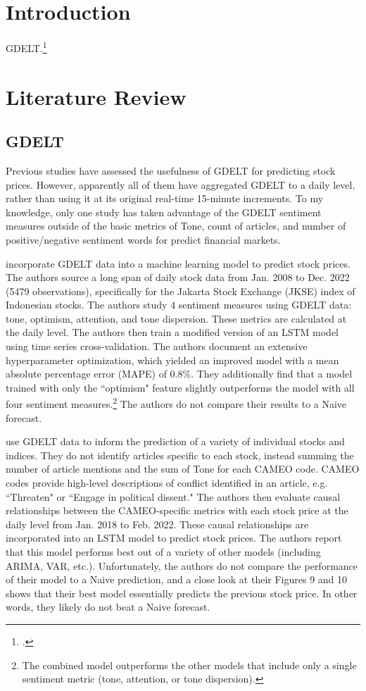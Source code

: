 \documentclass[12pt]{article}
\begin{document}
\section{Introduction}

GDELT.\footnote{\cite{leetaru2013gdelt}.}
\section{Literature Review}
\subsection{GDELT}
Previous studies have assessed the usefulness of GDELT for predicting stock prices. However, apparently all of them have aggregated GDELT to a daily level, rather than using it at its original real-time 15-minute increments. To my knowledge, only one study has taken advantage of the GDELT sentiment measures outside of the basic metrics of Tone, count of articles, and number of positive/negative sentiment words for predict financial markets.

\cite{nashir2023indonesian} incorporate GDELT data into a machine learning model to predict stock prices. The authors source a long span of daily stock data from Jan. 2008 to Dec. 2022 (5479 observations), specifically for the Jakarta Stock Exchange (JKSE) index of Indonesian stocks. The authors study 4 sentiment measures using GDELT data: tone, optimism, attention, and tone dispersion. These metrics are calculated at the daily level. The authors then train a modified version of an LSTM model using time series cross-validation. The authors document an extensive hyperparameter optimization, which yielded an improved model with a mean absolute percentage error (MAPE) of 0.8\%. They additionally find that a model trained with only the ``optimism" feature slightly outperforms the model with all four sentiment measures.\footnote{The combined model outperforms the other models that include only a single sentiment metric (tone, attention, or tone dispersion).} The authors do not compare their results to a Naive forecast.

\cite{wang2024ensemble} use GDELT data to inform the prediction of a variety of individual stocks and indices. They do not identify articles specific to each stock, instead summing the number of article mentions and the sum of Tone for each CAMEO code. CAMEO codes provide high-level descriptions of conflict identified in an article, e.g. ``Threaten" or ``Engage in political dissent." The authors then evaluate causal relationships between the CAMEO-specific metrics with each stock price at the daily level from Jan. 2018 to Feb. 2022. These causal relationships are incorporated into an LSTM model to predict stock prices. The authors report that this model performs best out of a variety of other models (including ARIMA, VAR, etc.). Unfortunately, the authors do not compare the performance of their model to a Naive prediction, and a close look at their Figures 9 and 10 shows that their best model essentially predicts the previous stock price. In other words, they likely do not beat a Naive forecast.
\end{document}
